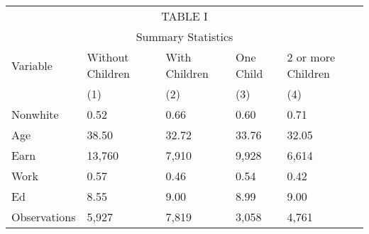 \begin{tabular}[H]{ |p{2cm}||p{2cm}p{2cm}p{2cm}p{2cm}|}
 \hline
 \multicolumn{5}{|c|}{TABLE I} \\
 \multicolumn{5}{|c|}{Summary Statistics} \\
 \hline
 \hline
   Variable &Without Children & With Children & One Child & 2 or more Children\\
  & (1) & (2) & (3) & (4)\\
Nonwhite&0.52&0.66&0.60&0.71\\
Age&38.50&32.72&33.76&32.05\\
Earn&13,760&7,910&9,928&6,614\\
Work&0.57&0.46&0.54&0.42\\
Ed&8.55&9.00&8.99&9.00\\
Observations&5,927&7,819&3,058&4,761\\
\hline

\end{tabular}

